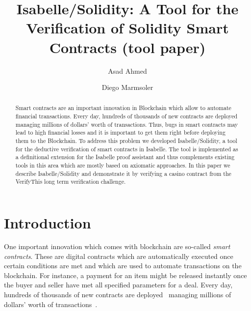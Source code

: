 \documentclass[a4paper,UKenglish,cleveref, autoref, thm-restate]{oasics-v2021}
\title{Isabelle/Solidity: A Tool  for the Verification of Solidity Smart Contracts (tool paper)} %
\author{Asad {Ahmed}}{University of Exeter, Exeter EX4 4PY, UK \and \url{https://sites.google.com/view/asad-ahmed/home} }{a.ahmed6@exeter.ac.uk}{https://orcid.org/0000-0001-8276-0975}{}%
\author{Diego Marmsoler}{University of Exeter, Exeter EX4 4PY, UK}{d.marmsoler@exeter.ac.uk}{[https://orcid.org/0000-0003-2859-7673]}{}
\begin{document}
\maketitle

\begin{abstract}
	Smart contracts are an important innovation in Blockchain which allow to automate financial transactions.
	Every day, hundreds of thousands of new contracts are deployed managing millions of dollars' worth of transactions.
	Thus, bugs in smart contracts may lead to high financial losses and it is important to get them right before deploying them to the Blockchain.
	To address this problem we developed Isabelle/Solidity, a tool for the deductive verification of smart contracts in Isabelle.
	The tool is implemented as a definitional extension for the Isabelle proof assistant and thus complements existing tools in this area which are mostly based on axiomatic approaches.
	In this paper we describe Isabelle/Solidity and demonstrate it by verifying a casino contract from the VerifyThis long term verification challenge.
\end{abstract}

\section{Introduction}
\label{sec-intro}
One important innovation which comes with blockchain are so-called \emph{smart contracts}.
These are digital contracts which are automatically executed once certain conditions are met and which are used to automate transactions on the blockchain.
For instance, a payment for an item might be released instantly once the buyer and seller have met all specified parameters for a deal.
Every day, hundreds of thousands of new contracts are deployed~\cite{etherscan:contracts} managing millions of dollars' worth of transactions~\cite{ycharts:transactions}.
\end{document}
